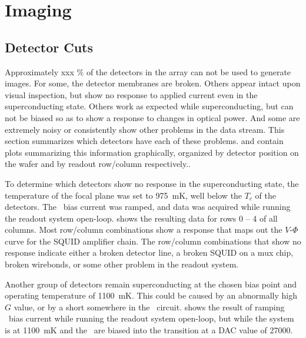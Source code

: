 \chapter{Imaging}\label{c:imaging}

\section{Detector Cuts} \label{sec:ch8-det-cuts}

Approximately xxx \% of the detectors in the array can not be used to generate images.
For some, the detector membranes are broken.
Others appear intact upon visual inspection, but show no response to applied current even in the superconducting state.
Others work as expected while superconducting, but can not be biased so as to show a response to changes in optical power. 
And some are extremely noisy or consistently show other problems in the data stream.
This section summarizes which detectors have each of these problems.
 and  contain plots summarizing this information graphically, organized by detector position on the wafer and by readout row/column respectively..

To determine which detectors show no response in the superconducting state, the temperature of the focal plane was set to 975~mK, well below the $T_c$ of the detectors.
The \TES\ bias current was ramped, and data was acquired while running the readout system open-loop.
 shows the resulting data for rows 0 -- 4 of all columns.
Most row/column combinations show a response that maps out the $V$-$\Phi$ curve for the SQUID amplifier chain.
The row/column combinations that show no response indicate either a broken detector line, a broken SQUID on a mux chip, broken wirebonds, or some other problem in the readout system.

Another group of detectors remain superconducting at the chosen bias point and operating temperature of 1100~mK.
This could be caused by an abnormally high $G$ value, or by a short somewhere in the \TES\ circuit.
 shows the result of ramping \TES\ bias current while running the readout system open-loop, but while the system is at 1100~mK and the \TESs\ are biased into the transition at a DAC value of 27000.

